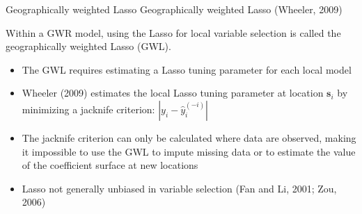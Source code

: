 \documentclass[12pt,t]{beamer}
\newcommand{\subt}[1]{{\footnotesize \color{subtitle} {#1}}}
\begin{document}
\begin{frame}{Geographically weighted Lasso}
\subt{Geographically weighted Lasso (Wheeler, 2009)}

\bigskip
Within a GWR model, using the Lasso for local variable selection is called the geographically weighted Lasso (GWL).
\begin{itemize}
    \item The GWL requires estimating a Lasso tuning parameter for each local model
    \item Wheeler (2009) estimates the local Lasso tuning parameter at location $\bm{s}_i$ by minimizing a jacknife criterion: $|y_i - \hat{y}_i^{(-i)}|$
    \item The jacknife criterion can only be calculated where data are observed, making it impossible to use the GWL to impute missing data or to estimate the value of the coefficient surface at new locations
    \item Lasso not generally unbiased in variable selection (Fan and Li, 2001; Zou, 2006)
\end{itemize}

\end{frame}
\end{document}
